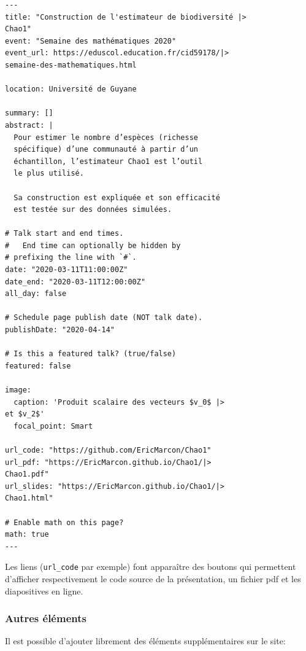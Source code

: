\documentclass[
  12pt,
  french,
  a4paper,
  extrafontsizes,onecolumn,openright
  ]{memoir}
\begin{document}
\begin{verbatim}
---
title: "Construction de l'estimateur de biodiversité |>
Chao1"
event: "Semaine des mathématiques 2020"
event_url: https://eduscol.education.fr/cid59178/|>
semaine-des-mathematiques.html

location: Université de Guyane

summary: []
abstract: |
  Pour estimer le nombre d’espèces (richesse 
  spécifique) d’une communauté à partir d’un 
  échantillon, l’estimateur Chao1 est l’outil 
  le plus utilisé.

  Sa construction est expliquée et son efficacité
  est testée sur des données simulées.

# Talk start and end times.
#   End time can optionally be hidden by 
# prefixing the line with `#`.
date: "2020-03-11T11:00:00Z"
date_end: "2020-03-11T12:00:00Z"
all_day: false

# Schedule page publish date (NOT talk date).
publishDate: "2020-04-14"

# Is this a featured talk? (true/false)
featured: false

image:
  caption: 'Produit scalaire des vecteurs $v_0$ |>
et $v_2$'
  focal_point: Smart

url_code: "https://github.com/EricMarcon/Chao1"
url_pdf: "https://EricMarcon.github.io/Chao1/|>
Chao1.pdf"
url_slides: "https://EricMarcon.github.io/Chao1/|>
Chao1.html"

# Enable math on this page?
math: true
---
\end{verbatim}

Les liens (\texttt{url\_code} par exemple) font apparaître des boutons qui permettent d'afficher respectivement le code source de la présentation, un fichier pdf et les diapositives en ligne.

\hypertarget{autres-uxe9luxe9ments}{%
\subsubsection{Autres éléments}\label{autres-uxe9luxe9ments}}

Il est possible d'ajouter librement des éléments supplémentaires sur le site:
\end{document}

